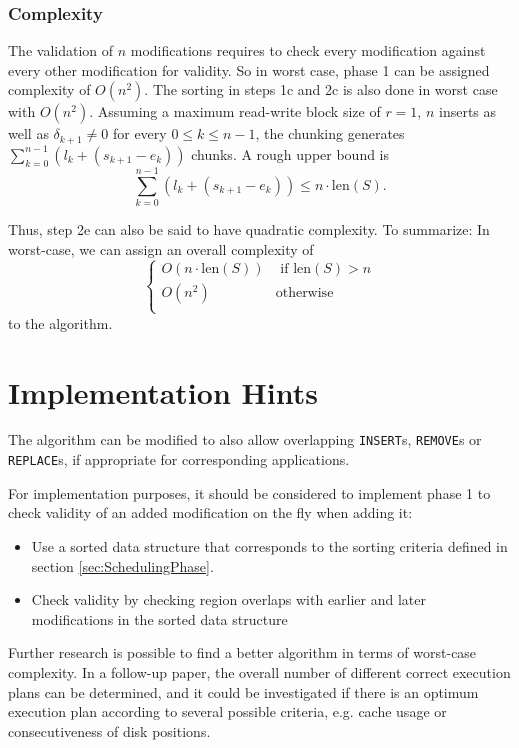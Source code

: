 \documentclass[english, 10pt, openright, twocolumn, landscape, twoside, notitlepage, a4paper, pdftex]		
{article}
\begin{document}
\subsubsection{Complexity}%
\label{sec:Complexity}%

The validation of $n$ modifications requires to check every modification against every other modification for validity. So in worst case, phase 1 can be assigned complexity of $O(n^{2})$. The sorting in steps 1c and 2c is also done in worst case with $O(n^{2})$. Assuming a maximum read-write block size of $r=1$, $n$ inserts as well as $\delta_{k+1}\neq 0$ for every $0\leq k\leq n-1$, the chunking generates $\sum_{k=0}^{n-1}{\left(l_{k}+(s_{k+1}-e_{k})\right)}$ chunks. A rough upper bound is  
\[\sum_{k=0}^{n-1}{\left(l_{k}+(s_{k+1}-e_{k})\right)}\leq n\cdot \text{len}(S).\]

Thus, step 2e can also be said to have quadratic complexity. To summarize: In worst-case, we can assign an overall complexity of 
\[
\begin{cases}
O(n\cdot\text{len}(S)) & \text{ if }\text{len}(S) > n\\
O(n^{2}) & \text{otherwise}\\
\end{cases}
\] to the algorithm.

\section{Implementation Hints}%
\label{sec:ImplementationHintsandOutlook}%

The algorithm can be modified to also allow overlapping \texttt{INSERT}s, \texttt{REMOVE}s or \texttt{REPLACE}s, if appropriate for corresponding applications.

For implementation purposes, it should be considered to implement phase 1 to check validity of an added modification on the fly when adding it:
\begin{itemize}
\item Use a sorted data structure that corresponds to the sorting criteria defined in section \ref{sec:SchedulingPhase}.
\item Check validity by checking region overlaps with earlier and later modifications in the sorted data structure
\end{itemize}

Further research is possible to find a better algorithm in terms of worst-case complexity. In a follow-up paper, the overall number of different correct execution plans can be determined, and it could be investigated if there is an optimum execution plan according to several possible criteria, e.g. cache usage or consecutiveness of disk positions.
\end{document}
